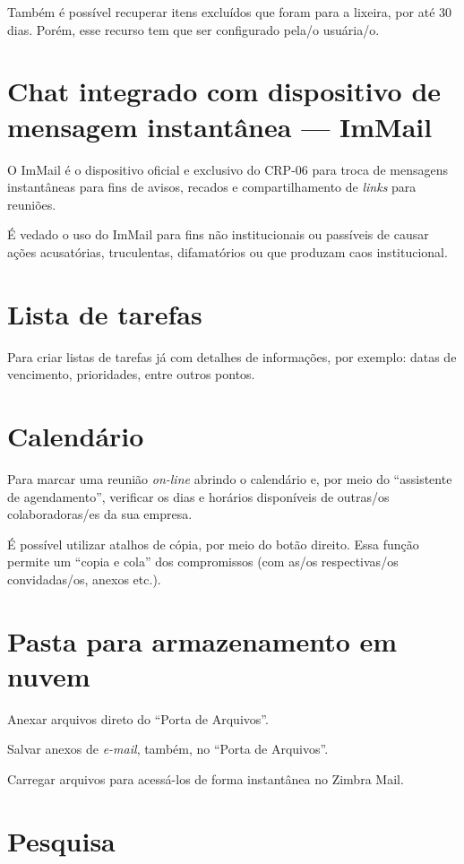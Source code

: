 \documentclass[openright, twoside, a4paper]{memoir}
\begin{document}
Também é possível recuperar itens excluídos que foram para a lixeira,
por até 30 dias. Porém, esse recurso tem que ser configurado pela/o
usuária/o.

\section{Chat integrado com dispositivo de mensagem instantânea
---
ImMail}

O ImMail é o dispositivo oficial e exclusivo do CRP-06 para troca de
mensagens instantâneas para fins de avisos, recados e compartilhamento
de \emph{links} para reuniões.

É vedado o uso do ImMail para fins não institucionais ou passíveis de
causar ações acusatórias, truculentas, difamatórios ou que produzam caos
institucional.

\section{Lista de tarefas}

Para criar listas de tarefas já com detalhes de informações, por
exemplo: datas de vencimento, prioridades, entre outros pontos.

\section{Calendário}

Para marcar uma reunião \emph{on-line} abrindo o calendário e, por meio
do ``assistente de agendamento'', verificar os dias e horários
disponíveis de outras/os colaboradoras/es da sua empresa.

É possível utilizar atalhos de cópia, por meio do botão direito. Essa
função permite um ``copia e cola'' dos compromissos (com as/os
respectivas/os convidadas/os, anexos etc.).

\section{Pasta para armazenamento em
nuvem}

Anexar arquivos direto do ``Porta de Arquivos''.

Salvar anexos de \emph{e-mail}, também, no ``Porta de Arquivos''.

Carregar arquivos para acessá-los de forma instantânea no Zimbra Mail.

\section{Pesquisa}
\end{document}

